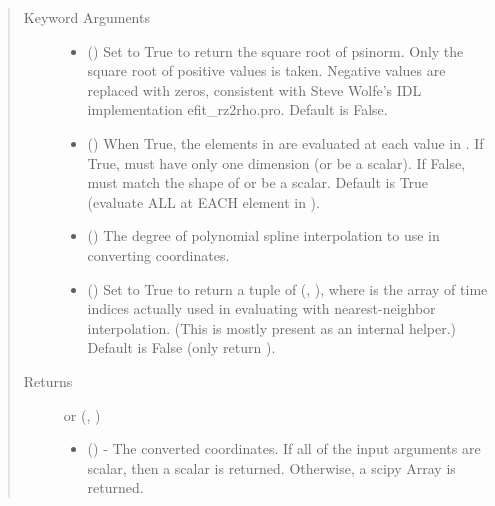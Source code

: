 \documentclass[letterpaper,10pt,english]{sphinxmanual}
\begin{document}
\begin{fulllineitems}
\begin{fulllineitems}
\begin{quote}
\begin{description}
\begin{itemize}
\end{itemize}

\item[{Keyword Arguments}] \leavevmode\begin{itemize}
\item {} 
 () \textendash{} Set to True to return the square root of psinorm.
Only the square root of positive values is taken. Negative
values are replaced with zeros, consistent with Steve Wolfe’s
IDL implementation efit\_rz2rho.pro. Default is False.

\item {} 
 () \textendash{} When True, the elements in  are evaluated
at each value in . If True,  must have only one dimension
(or be a scalar). If False,  must match the shape of 
or be a scalar. Default is True (evaluate ALL  at EACH
element in ).

\item {} 
 () \textendash{} The degree of polynomial spline interpolation to
use in converting coordinates.

\item {} 
 () \textendash{} Set to True to return a tuple of (,
), where  is the array of time indices
actually used in evaluating  with nearest-neighbor
interpolation. (This is mostly present as an internal helper.)
Default is False (only return ).

\end{itemize}

\item[{Returns}] \leavevmode

 or (, )
\begin{itemize}
\item {} 
 () - The converted coordinates. If
all of the input arguments are scalar, then a scalar is returned.
Otherwise, a scipy Array is returned.


\end{itemize}
\end{description}
\end{quote}
\end{fulllineitems}
\end{fulllineitems}
\end{document}
